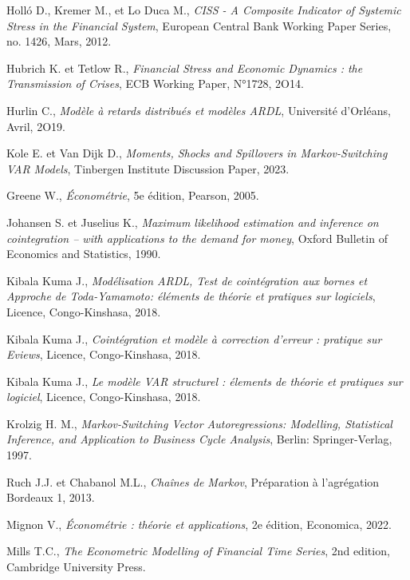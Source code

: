 \begin{thebibliography}{MMM99}
Holló D., Kremer M., et Lo Duca M., 
\textit{CISS - A Composite Indicator of Systemic Stress in the Financial System},
European Central Bank Working Paper Series, no. 1426, Mars, 2012.

Hubrich K. et Tetlow R., 
\textit{Financial Stress and Economic Dynamics : the Transmission of Crises},
ECB Working Paper, N°1728, 2O14.

Hurlin C., 
\textit{Modèle à retards distribués et modèles ARDL},
Université d'Orléans, Avril, 2O19.

Kole E. et Van Dijk D., 
\textit{Moments, Shocks and Spillovers in
Markov-Switching VAR Models},
Tinbergen Institute Discussion Paper, 2023.

Greene W.,
\textit{Économétrie},
5e édition,
Pearson, 2005.

Johansen S. et Juselius K.,
\textit{ Maximum likelihood estimation and
inference on cointegration – with applications to the demand for money},
Oxford Bulletin of Economics and Statistics,
1990.

Kibala Kuma J., 
\textit{Modélisation ARDL, Test de cointégration aux bornes et Approche de Toda-Yamamoto: éléments de théorie et pratiques sur logiciels},
Licence, Congo-Kinshasa, 2018.

Kibala Kuma J., 
\textit{Cointégration et modèle à correction d'erreur : pratique sur Eviews},
Licence, Congo-Kinshasa, 2018.

Kibala Kuma J., 
\textit{Le modèle VAR structurel : élements de théorie et pratiques sur logiciel},
Licence, Congo-Kinshasa, 2018.

Krolzig H. M., 
\textit{Markov-Switching Vector Autoregressions: Modelling, Statistical Inference, and Application to Business Cycle Analysis},
Berlin: Springer-Verlag, 1997.

Ruch J.J. et Chabanol M.L., 
\textit{Chaînes de Markov},
Préparation à l'agrégation Bordeaux 1, 2013.

Mignon V.,
\textit{Économétrie : théorie et applications},
2e édition,
Economica, 2022.

Mills T.C.,
\textit{The Econometric Modelling of Financial Time Series},
2nd edition, Cambridge University Press.


\end{thebibliography}
